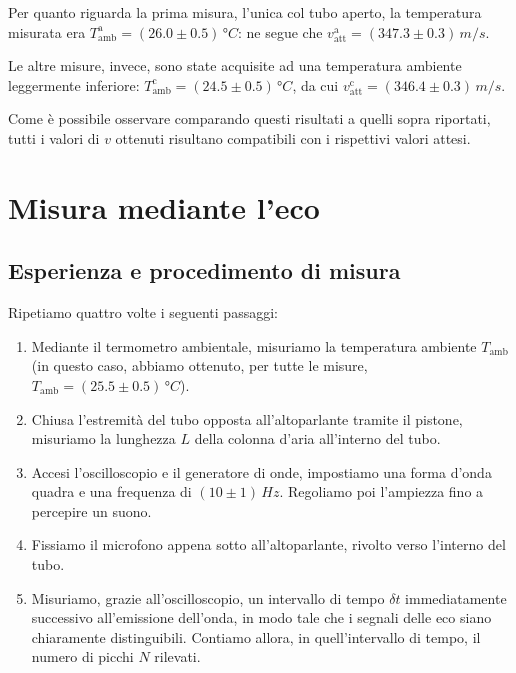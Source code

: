 \documentclass{article}
\begin{document}
Per quanto riguarda la prima misura, l'unica col tubo aperto,
la temperatura misurata era
$T_\text{amb}^\text{a} = (26.0\pm0.5)\,\unit{\degree C}$:
ne segue che $v_\text{att}^\text{a}=(347.3\pm0.3)\,\unit{m\per s}$.

Le altre misure, invece, sono state acquisite ad una
temperatura ambiente leggermente inferiore:
$T_\text{amb}^\text{c} = (24.5\pm0.5)\,\unit{\degree C}$,
da cui $v_\text{att}^\text{c} = (346.4\pm0.3)\,\unit{m\per s}$.

\vspace{2mm}
Come è possibile osservare comparando questi risultati a
quelli sopra riportati, tutti i valori di $v$ ottenuti
risultano compatibili con i rispettivi valori attesi.

\section{Misura mediante l'eco}

\subsection{Esperienza e procedimento di misura}

Ripetiamo quattro volte i seguenti passaggi:
\begin{enumerate}
  \item
    Mediante il termometro ambientale, misuriamo la temperatura ambiente
    $T_\text{amb}$ (in questo caso, abbiamo ottenuto, per tutte le misure,
    $T_\text{amb}=(25.5\pm0.5)\,\unit{\degree C}$).
  \item
    Chiusa l'estremità del tubo opposta all'altoparlante tramite il pistone,
    misuriamo la lunghezza $L$ della colonna d'aria all'interno del tubo.
  \item
    Accesi l'oscilloscopio e il generatore di onde, impostiamo una
    forma d'onda quadra e una frequenza di $(10\pm1)\,\unit{Hz}$.
    Regoliamo poi l'ampiezza fino a percepire un suono.
  \item
    Fissiamo il microfono appena sotto all'altoparlante, rivolto verso
    l'interno del tubo.
  \item
    Misuriamo, grazie all'oscilloscopio, un intervallo di tempo $\delta t$
    immediatamente successivo all'emissione dell'onda,
    in modo tale che i segnali delle eco siano chiaramente distinguibili.
    Contiamo allora, in quell'intervallo di tempo, il numero di picchi
    $N$ rilevati.
\end{enumerate}
\end{document}
